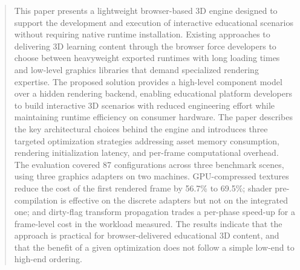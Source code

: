 \begin{abstract}
This paper presents a lightweight browser-based 3D engine designed to support the development and execution of interactive educational scenarios without requiring native runtime installation. Existing approaches to delivering 3D learning content through the browser force developers to choose between heavyweight exported runtimes with long loading times and low-level graphics libraries that demand specialized rendering expertise. The proposed solution provides a high-level component model over a hidden rendering backend, enabling educational platform developers to build interactive 3D scenarios with reduced engineering effort while maintaining runtime efficiency on consumer hardware. The paper describes the key architectural choices behind the engine and introduces three targeted optimization strategies addressing asset memory consumption, rendering initialization latency, and per-frame computational overhead. The evaluation covered 87 configurations across three benchmark scenes, using three graphics adapters on two machines. GPU-compressed textures reduce the cost of the first rendered frame by 56.7\% to 69.5\%; shader pre-compilation is effective on the discrete adapters but not on the integrated one; and dirty-flag transform propagation trades a per-phase speed-up for a frame-level cost in the workload measured. The results indicate that the approach is practical for browser-delivered educational 3D content, and that the benefit of a given optimization does not follow a simple low-end to high-end ordering.


\end{abstract}